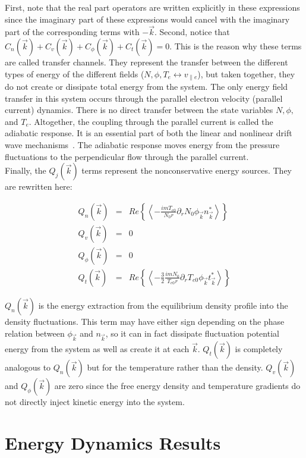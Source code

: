 \documentclass[showpacs,preprintnumbers,amsmath,amssymb,superscriptaddress,aip]{revtex4-1}
\def\beqar{\begin{eqnarray}}
\def\eeqar{\end{eqnarray}}
\def\para{\parallel}
\newcommand{\pdr}{\partial_r}
\begin{document}
First, note that the real part operators are written explicitly in these expressions since the imaginary part of these expressions would cancel with the imaginary part of the 
corresponding terms with $-\vec{k}$. Second, notice that $C_n(\vec{k}) + C_v(\vec{k}) + C_\phi(\vec{k}) + C_t(\vec{k}) = 0$.
This is the reason why these terms are called transfer channels. They represent the transfer
between the different types of energy of the different fields ($N,\phi,T_e \leftrightarrow v_{\para e}$), but taken together, they do not create or dissipate total
energy from the system. The only energy field transfer in this system occurs through the parallel electron velocity (parallel current) dynamics. There is no direct transfer between
the state variables $N, \phi,$ and $T_e$.  Altogether, the coupling through the parallel current is called the
adiabatic response. It is an essential part of both the linear and nonlinear
drift wave mechanisms~\cite{scott2002,scott2005}. The adiabatic response moves energy from the pressure fluctuations to the perpendicular flow through the parallel current. \\

Finally, the $Q_j(\vec{k})$ terms represent the nonconservative energy sources. They are rewritten here:

\beqar
Q_n(\vec{k}) & = & Re \left\{ \left< -\frac{i m T_{e0}}{N_0 r} \pdr N_0 \phi_{\vec{k}} n_{\vec{k}}^*  \right> \right\}
\label{Qnk} \\
Q_v(\vec{k}) & = & 0
\label{Qvk} \\
Q_\phi(\vec{k}) & = & 0
\label{Qpk} \\
Q_t(\vec{k}) & = & Re \left\{ \left< -\frac{3}{2} \frac{i m N_0}{T_{e0} r} \pdr T_{e0} \phi_{\vec{k}} t_{\vec{k}}^*  \right> \right\}
\label{Qtk}
\eeqar

$Q_n(\vec{k})$ is the energy extraction from the equilibrium density profile into the density fluctuations. 
This term may have either sign depending on the phase relation between $\phi_{\vec{k}}$ and $n_{\vec{k}}$, 
so it can in fact dissipate fluctuation potential energy from the system as well as create it
at each $\vec{k}$. $Q_t(\vec{k})$ is completely analogous to $Q_n(\vec{k})$ but for the temperature rather than the density. 
$Q_v(\vec{k})$ and $Q_\phi(\vec{k})$ are zero since the free energy density and temperature gradients do not directly inject kinetic energy into the system.


\section{Energy Dynamics Results}
\end{document}
